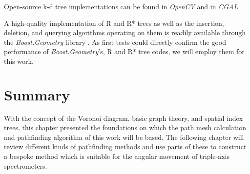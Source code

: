 Open-source k-d tree implementations can be found in \textit{OpenCV} \cite{web_opencv} 
and in \textit{CGAL} \cite{web_cgal}.

A high-quality implementation of R and R* trees as well as the insertion, deletion, and querying algorithms 
operating on them is readily available through the \textit{Boost.Geometry} library \cite{web_boost_geometry, web_boost_geometry_rtree}. As first tests could directly confirm the good performance of \textit{Boost.Geometry}'s,
R and R* tree codes, we will employ them for this work.



\section{Summary}
With the concept of the Voronoi diagram, basic graph theory, and spatial index trees, 
this chapter presented the foundations on which the path mesh calculation and pathfinding
algorithm of this work will be based. The following chapter will review different kinds
of pathfinding methods and use parts of these to construct a bespoke method which
is suitable for the angular movement of triple-axis spectrometers.
